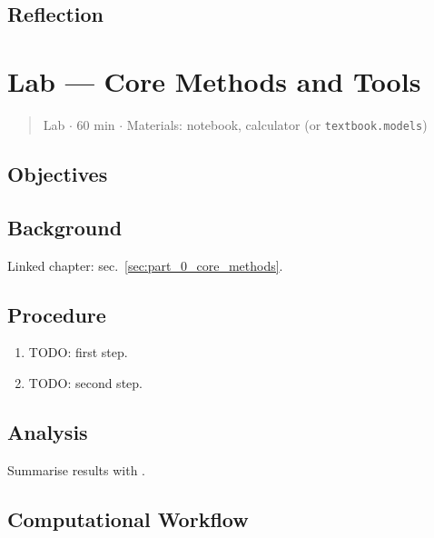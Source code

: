 \documentclass[
]{article}
\theoremstyle{plain}
\theoremstyle{definition}
\begin{document}
\subsection{Reflection}\label{reflection}

\newpage

\section{Lab --- Core Methods and
Tools}\label{sec:lab_part_0_core_methods}

\begin{quote}
Lab \texorpdfstring{\ensuremath{\cdot}}{.} 60 min \texorpdfstring{\ensuremath{\cdot}}{.} Materials: notebook, calculator (or
\texttt{textbook.models})
\end{quote}

\subsection{Objectives}\label{objectives-1}

\subsection{Background}\label{background-1}

Linked chapter: sec.~\ref{sec:part_0_core_methods}.

\subsection{Procedure}\label{procedure-1}

\begin{enumerate}
\def\labelenumi{\arabic{enumi}.}
\item
  TODO: first step.
\item
  TODO: second step.
\end{enumerate}

\subsection{Analysis}\label{analysis-1}

Summarise results with .

\subsection{Computational Workflow}\label{computational-workflow-1}
\end{document}
